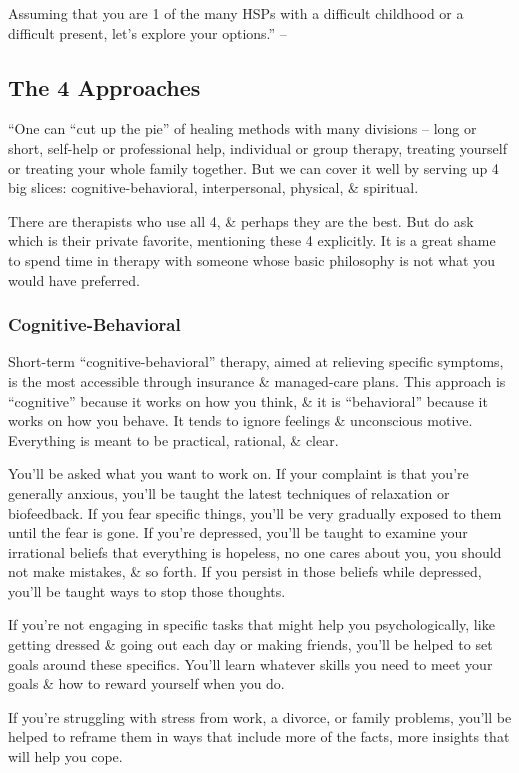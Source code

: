 \documentclass{article}
\numberwithin{equation}{section}
\begin{document}
Assuming that you are 1 of the many HSPs with a difficult childhood or a difficult present, let's explore your options.'' -- \cite[pp. 203--205]{Aron2013}

\subsection{The 4 Approaches}
``One can ``cut up the pie'' of healing methods with many divisions -- long or short, self-help or professional help, individual or group therapy, treating yourself or treating your whole family together. But we can cover it well by serving up 4 big slices: cognitive-behavioral, interpersonal, physical, \& spiritual.

There are therapists who use all 4, \& perhaps they are the best. But do ask which is their private favorite, mentioning these 4 explicitly. It is a great shame to spend time in therapy with someone whose basic philosophy is not what you would have preferred.

\subsubsection{Cognitive-Behavioral}
Short-term ``cognitive-behavioral'' therapy, aimed at relieving specific symptoms, is the most accessible through insurance \& managed-care plans. This approach is ``cognitive'' because it works on how you think, \& it is ``behavioral'' because it works on how you behave. It tends to ignore feelings \& unconscious motive. Everything is meant to be practical, rational, \& clear.

You'll be asked what you want to work on. If your complaint is that you're generally anxious, you'll be taught the latest techniques of relaxation or biofeedback. If you fear specific things, you'll be very gradually exposed to them until the fear is gone. If you're depressed, you'll be taught to examine your irrational beliefs that everything is hopeless, no one cares about you, you should not make mistakes, \& so forth. If you persist in those beliefs while depressed, you'll be taught ways to stop those thoughts.

If you're not engaging in specific tasks that might help you psychologically, like getting dressed \& going out each day or making friends, you'll be helped to set goals around these specifics. You'll learn whatever skills you need to meet your goals \& how to reward yourself when you do.

If you're struggling with stress from work, a divorce, or family problems, you'll be helped to reframe them in ways that include more of the facts, more insights that will help you cope.
\end{document}
